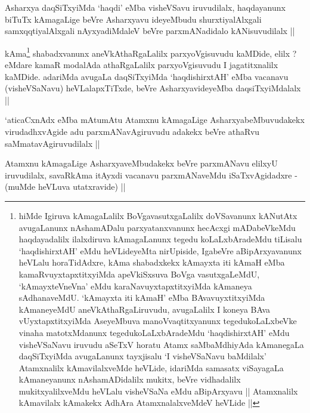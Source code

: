 
\begin{artha}
Asharxya daqSiTxyiMda `haqdi' eMba visheVSavu iruvudilalx, haqdayanunx
biTuTx kAmagaLige beVre Asharxyavu ideyeMbudu shurxtiyalAlxgali
samxqqtiyalAlxgali nAyxyadiMdaleV beVre parxmANadidalo kANisuvudilalx ||
\end{artha}


\begin{artha}
kAma\footnote{hiMde Igiruva kAmagaLalilx BoVgavasutxgaLalilx
  doVSavanunx kANutAtx avugaLanunx nAshamADalu parxyatanxvanunx
  hecAcxgi mADabeVkeMdu haqdayadalilx ilalxdiruva kAmagaLanunx tegedu
  koLaLxbAradeMdu tiLisalu `haqdishirxtAH' eMdu heVLideyeMta
  nirUpiside, IgabeVre aBipArxyavanunx heVLalu horaTidAdxre, kAma
  shabadxkekx kAmayxta iti kAmaH eMba kamaRvuyxtapxtitxyiMda
  apeVkiSxsuva BoVga vasutxgaLeMdU, `kAmayxteV\s neVna' eMdu
  karaNavuyxtapxtitxyiMda kAmaneya sAdhanaveMdU. `kAmayxta iti kAmaH'
  eMba BAvavuyxtitxyiMda kAmaneyeMdU aneVkAthaRgaLiruvudu, avugaLalilx
  I koneya BAva vUyxtapxtitxyiMda AseyeMbuva manoVvaqtitxyanunx
  tegedukoLaLxbeVke vinaha matotxMdanunx tegedukoLaLxbAradeMdu
  `haqdishirxtAH' eMdu visheVSaNavu iruvudu aSeTxV horatu Atamx
  saMbaMdhiyAda kAmanegaLa daqSiTxyiMda avugaLanunx tayxjisalu `I
  visheVSaNavu baMdilalx' Atamxnalilx kAmavilalxveMde heVLide,
  idariMda samasatx viSayagaLa kAmaneyanunx nAshamADidalilx mukitx,
  beVre vidhadalilx mukitxyalilxveMdu heVLalu visheVSaNa eMdu
  aBipArxyavu || Atamxnalilx kAmavilalx kAmakekx AdhAra
  AtamxnalalxveMdeV heVLide ||} shabadxvanunx aneVkAthaRgaLalilx parxyoVgisuvudu
kaMDide, elilx ? eMdare kamaR modalAda athaRgaLalilx parxyoVgisuvudu I
jagatitxnalilx kaMDide. adariMda avugaLa daqSiTxyiMda `haqdishirxtAH'
eMba vacanavu (visheVSaNavu) heVLalapxTiTxde, beVre AsharxyavideyeMba
daqsiTxyiMdalalx ||
\end{artha}


\begin{artha}
`aticaCxnAdx eMba mAtumAtu Atamxnu kAmagaLige AsharxyabeMbuvudakekx
  virudadhxvAgide adu parxmANavAgiruvudu adakekx beVre athaRvu
  saMmatavAgiruvudilalx ||
\end{artha}

\begin{artha}
Atamxnu kAmagaLige AsharxyaveMbudakekx beVre parxmANavu elilxyU
iruvudilalx, savaRkAma itAyxdi vacanavu parxmANaveMdu iSaTxvAgidadxre
- (muMde heVLuva utatxravide) || 
\end{artha}

